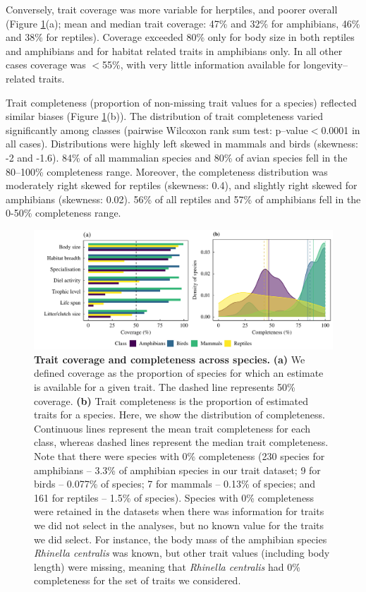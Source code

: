 Conversely, trait coverage was more variable for herptiles, and poorer overall (Figure \ref{1_Coverage}(a); mean and median trait coverage: 47\% and 32\% for amphibians, 46\% and 38\% for reptiles). Coverage exceeded 80\% only for body size in both reptiles and amphibians and for habitat related traits in amphibians only. In all other cases coverage was  $<$55\%, with very little information available for longevity--related traits. 

Trait completeness (proportion of non-missing trait values for a species) reflected similar biases (Figure \ref{1_Coverage}(b)). The distribution of trait completeness varied significantly among classes (pairwise Wilcoxon rank sum test: p--value$<$0.0001 in all cases). Distributions were highly left skewed in mammals and birds (skewness: -2 and -1.6). 84\% of all mammalian species and 80\% of avian species fell in the 80--100\% completeness range. Moreover, the completeness distribution was moderately right skewed for reptiles (skewness: 0.4), and slightly right skewed for amphibians (skewness: 0.02). 56\% of all reptiles and 57\% of amphibians fell in the 0-50\% completeness range. 

\begin{figure}[h!]
\centering
\includegraphics[scale=0.7]{figures/Chapter1/Figure1_revised}
\caption[Trait coverage and completeness across species.]{\textbf{Trait coverage and completeness across species.} \textbf{(a)} We defined coverage as the proportion of species for which an estimate is available for a given trait. The dashed line represents 50\% coverage. \textbf{(b)} Trait completeness is the proportion of estimated traits for a species. Here, we show the distribution of completeness. Continuous lines represent the mean trait completeness for each class, whereas dashed lines represent the median trait completeness. Note that there were species with 0\% completeness (230 species for amphibians -- 3.3\% of amphibian species in our trait dataset; 9 for birds -- 0.077\% of species; 7 for mammals -- 0.13\% of species; and 161 for reptiles -- 1.5\% of species). Species with 0\% completeness were retained in the datasets when there was information for traits we did not select in the analyses, but no known value for the traits we did select. For instance, the body mass of the amphibian species \textit{Rhinella centralis} was known, but other trait values (including body length) were missing, meaning that \textit{Rhinella centralis} had 0\% completeness for the set of traits we considered.}
\label{1_Coverage}
\end{figure}


